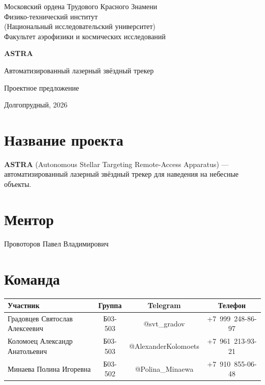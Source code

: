 \documentclass[12pt, a4paper]{article}
\begin{document}
\thispagestyle{empty}

\begin{center}

{\small
Московский ордена Трудового Красного Знамени\\
Физико-технический институт\\
(Национальный исследовательский университет)\\
Факультет аэрофизики и космических исследований
}

\vspace{1cm}

\vfill

{\Huge\bfseries ASTRA}

\vspace{0.5cm}

{\Large Автоматизированный лазерный звёздный трекер}

\vspace{0.5cm}

{\normalsize Проектное предложение}

\vfill

{\small Долгопрудный, 2026}

\end{center}

\newpage

\setcounter{page}{1}

\section*{Название проекта}

\textbf{ASTRA} (Autonomous Stellar Targeting Remote-Access Apparatus) --- автоматизированный лазерный звёздный трекер для наведения на небесные объекты.

\section*{Ментор}

Провоторов Павел Владимирович

\section*{Команда}

\begin{tabularx}{\textwidth}{|X|c|c|c|}
\hline
\textbf{Участник} & \textbf{Группа} & \textbf{Telegram} & \textbf{Телефон} \\
\hline
Градовцев Святослав Алексеевич & Б03-503 & @svt\_gradov & +7~999~248-86-97 \\
\hline
Коломоец Александр Анатольевич & Б03-503 & @AlexanderKolomoets & +7~961~213-93-21 \\
\hline
Минаева Полина Игоревна & Б03-502 & @Polina\_Minaewa & +7~910~855-06-48 \\
\hline
\end{tabularx}
\end{document}

